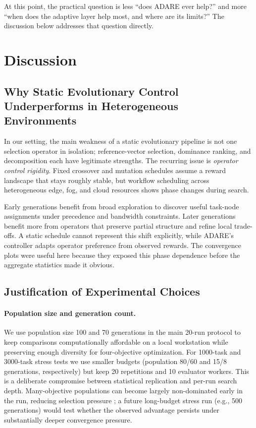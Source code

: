 \documentclass[preprint,12pt]{elsarticle}
\begin{document}
At this point, the practical question is less ``does ADARE ever help?'' and more ``when does the adaptive layer help most, and where are its limits?'' The discussion below addresses that question directly.
\section{Discussion}
\subsection{Why Static Evolutionary Control Underperforms in Heterogeneous Environments}
In our setting, the main weakness of a static evolutionary pipeline is not one selection operator in isolation; reference-vector selection, dominance ranking, and decomposition each have legitimate strengths. The recurring issue is \emph{operator control rigidity}. Fixed crossover and mutation schedules assume a reward landscape that stays roughly stable, but workflow scheduling across heterogeneous edge, fog, and cloud resources shows phase changes during search.

Early generations benefit from broad exploration to discover useful task-node assignments under precedence and bandwidth constraints. Later generations benefit more from operators that preserve partial structure and refine local trade-offs. A static schedule cannot represent this shift explicitly, while ADARE's controller adapts operator preference from observed rewards. The convergence plots were useful here because they exposed this phase dependence before the aggregate statistics made it obvious.
\subsection{Justification of Experimental Choices}
\paragraph{Population size and generation count.}
We use population size 100 and 70 generations in the main 20-run protocol to keep comparisons computationally affordable on a local workstation while preserving enough diversity for four-objective optimization. For 1000-task and 3000-task stress tests we use smaller budgets (population 80/60 and 15/8 generations, respectively) but keep 20 repetitions and 10 evaluator workers. This is a deliberate compromise between statistical replication and per-run search depth. Many-objective populations can become largely non-dominated early in the run, reducing selection pressure \cite{purshouse2007many}; a future long-budget stress run (e.g., 500 generations) would test whether the observed advantage persists under substantially deeper convergence pressure.
\end{document}
